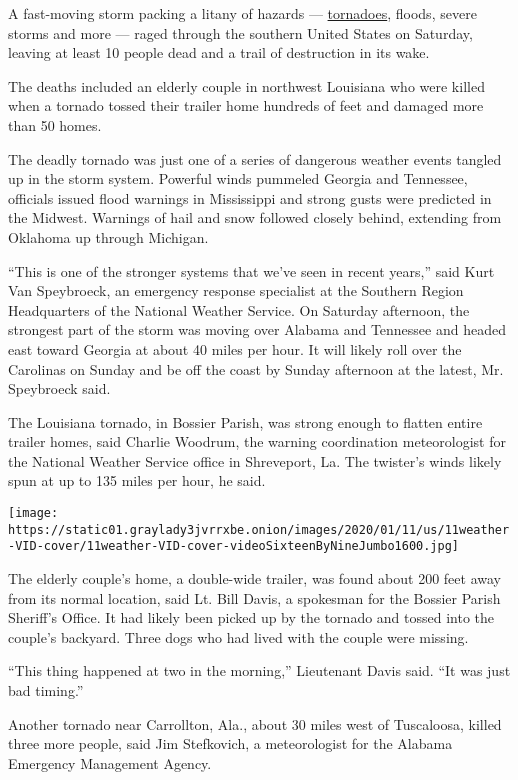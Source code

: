 A fast-moving storm packing a litany of hazards ---
\href{https://www.nytimes3xbfgragh.onion/2020/03/03/us/nashville-tornado-live.html}{tornadoes},
floods, severe storms and more --- raged through the southern United
States on Saturday, leaving at least 10 people dead and a trail of
destruction in its wake.

The deaths included an elderly couple in northwest Louisiana who were
killed when a tornado tossed their trailer home hundreds of feet and
damaged more than 50 homes.

The deadly tornado was just one of a series of dangerous weather events
tangled up in the storm system. Powerful winds pummeled Georgia and
Tennessee, officials issued flood warnings in Mississippi and strong
gusts were predicted in the Midwest. Warnings of hail and snow followed
closely behind, extending from Oklahoma up through Michigan.

``This is one of the stronger systems that we've seen in recent years,''
said Kurt Van Speybroeck, an emergency response specialist at the
Southern Region Headquarters of the National Weather Service. On
Saturday afternoon, the strongest part of the storm was moving over
Alabama and Tennessee and headed east toward Georgia at about 40 miles
per hour. It will likely roll over the Carolinas on Sunday and be off
the coast by Sunday afternoon at the latest, Mr. Speybroeck said.

The Louisiana tornado, in Bossier Parish, was strong enough to flatten
entire trailer homes, said Charlie Woodrum, the warning coordination
meteorologist for the National Weather Service office in Shreveport, La.
The twister's winds likely spun at up to 135 miles per hour, he said.

\texttt{[image: https://static01.graylady3jvrrxbe.onion/images/2020/01/11/us/11weather-VID-cover/11weather-VID-cover-videoSixteenByNineJumbo1600.jpg]}

The elderly couple's home, a double-wide trailer, was found about 200
feet away from its normal location, said Lt. Bill Davis, a spokesman for
the Bossier Parish Sheriff's Office. It had likely been picked up by the
tornado and tossed into the couple's backyard. Three dogs who had lived
with the couple were missing.

``This thing happened at two in the morning,'' Lieutenant Davis said.
``It was just bad timing.''

Another tornado near Carrollton, Ala., about 30 miles west of
Tuscaloosa, killed three more people, said Jim Stefkovich, a
meteorologist for the Alabama Emergency Management Agency.

